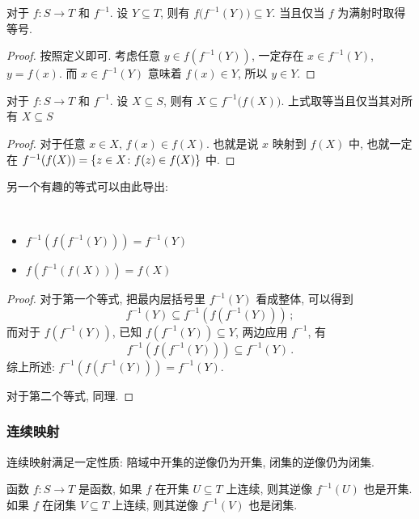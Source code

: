 \documentclass[UTF8]{ctexart}
\theoremstyle{mystyle}
\DeclarePairedDelimiter\set{\lbrace}{\rbrace}
\begin{document}
\begin{proposition}
    对于 $ f \colon S \to T $ 和 $ f^{-1} $. 设 $ Y \subseteq T $, 则有 $ f \big( f^{-1}(Y) \big) \subseteq Y $. 当且仅当 $ f $ 为满射时取得等号.
\end{proposition}

\begin{proof}
    按照定义即可. 考虑任意 $ y \in f( f^{-1}(Y) ) $, 一定存在 $ x \in f^{-1}(Y) $, $ y = f(x) $. 而 $ x \in f^{-1}(Y) $ 意味着 $ f(x) \in Y $, 所以 $ y \in Y $.
\end{proof}

\begin{proposition}
    对于 $ f \colon S \to T $ 和 $ f^{-1} $. 设 $ X \subseteq S $, 则有 $ X \subseteq f^{-1} \big( f (X) \big) $. 上式取等当且仅当其对所有 $ X \subseteq S $
\end{proposition}

\begin{proof}
    对于任意 $ x \in X $, $ f(x) \in f(X) $. 也就是说 $ x $ 映射到 $ f(X) $ 中, 也就一定在 $ f^{-1}(f(X)) = \set{z \in X \colon f(z) \in f(X)} $ 中.
\end{proof}

另一个有趣的等式可以由此导出:
\begin{proposition} \

    \begin{itemize}
        \item $ f^{-1}(f(f^{-1}(Y))) = f^{-1}(Y) $
        \item $ f(f^{-1}(f(X))) = f(X) $
    \end{itemize}
\end{proposition}

\begin{proof}
    对于第一个等式, 把最内层括号里 $ f^{-1}(Y) $ 看成整体, 可以得到 \[ f^{-1}(Y) \subseteq f^{-1}(f(f^{-1}(Y))) \,;\] 而对于 $ f(f^{-1}(Y)) $, 已知 $ f(f^{-1}(Y)) \subseteq Y $, 两边应用 $ f^{-1} $, 有 \[ f^{-1}(f(f^{-1}(Y))) \subseteq f^{-1}(Y) \,.\] 综上所述: $ f^{-1}(f(f^{-1}(Y))) = f^{-1}(Y) $.

    对于第二个等式, 同理.
\end{proof}


\subsubsection{连续映射}
连续映射满足一定性质: 陪域中开集的逆像仍为开集, 闭集的逆像仍为闭集.

\begin{proposition}
    函数 $ f \colon S \to T $ 是函数, 如果 $ f $ 在开集 $ U \subseteq T $ 上连续, 则其逆像 $ f^{-1}(U) $ 也是开集. 如果 $ f $ 在闭集 $ V \subseteq T $ 上连续, 则其逆像 $ f^{-1}(V) $ 也是闭集.
\end{proposition}
\end{document}
